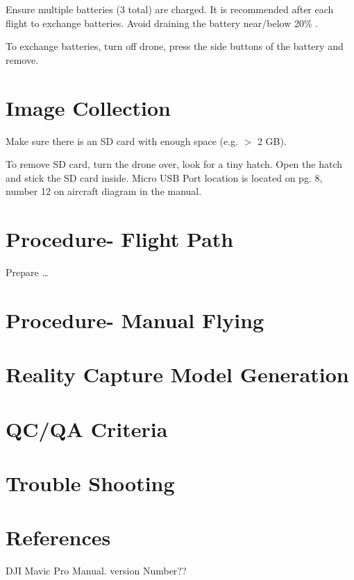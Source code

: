 \documentclass[12pt]{../SOP4_alpha}\usepackage[]{graphicx}\usepackage[]{color}
\begin{document}
\NP Ensure multiple batteries (3 total) are charged. It is recommended after each flight to exchange batteries. Avoid draining the battery near/below 20\% .

\NP To exchange batteries, turn off drone, press the side buttons of the battery and remove.


\section{Image Collection}

\NP Make sure there is an SD card with enough space (e.g. $ > $ 2 GB).

\NP To remove SD card, turn the drone over, look for a tiny hatch. Open the hatch and stick the SD card inside. Micro USB Port location is located on pg. 8, number 12 on aircraft diagram in the manual.

\section{Procedure- Flight Path}

\NP Prepare \dots

\section{Procedure- Manual Flying}

\section{Reality Capture Model Generation}

\section{QC/QA Criteria}

\section{Trouble Shooting}

\section{References}

\NP DJI Mavic Pro Manual. version Number??
\end{document}
